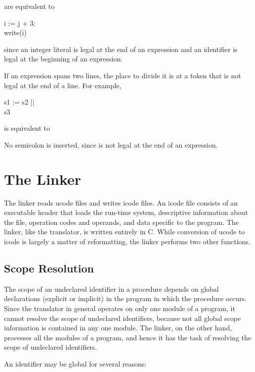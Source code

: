 \noindent are equivalent to

\begin{iconcode}
\>i := j + 3;\\
\>write(i)
\end{iconcode}

\noindent since an integer literal is legal at the end of an
expression and an identifier is legal at the beginning of an
expression.

If an expression spans two lines, the place to divide it is at a token
that is not legal at the end of a line. For example,

\begin{iconcode}
\>s1 := s2 ||\\
\>\>s3
\end{iconcode}

\noindent is equivalent to


\noindent No semicolon is inserted, since
\texttt{{\textbar}{\textbar}} is not legal at the end of an
expression.

\section{The Linker}

The linker reads ucode files and writes icode files. An icode file
consists of an executable header that loads the run-time system,
descriptive information about the file, operation codes and operands,
and data specific to the program. The linker, like the translator, is
written entirely in C. While conversion of ucode to icode is largely a
matter of reformatting, the linker performs two other functions.

\subsection{Scope Resolution}

The scope of an undeclared identifier in a procedure depends on global
declarations (explicit or implicit) in the program in which the
procedure occurs. Since the translator in general operates on only one
module of a program, it cannot resolve the scope of undeclared
identifiers, because not all global scope information is contained in
any one module. The linker, on the other hand, processes all the
modules of a program, and hence it has the task of resolving the scope
of undeclared identifiers.

An identifier may be global for several reasons:

